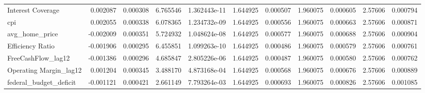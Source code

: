 \documentclass[12pt,a4paper,english]{article}
\begin{document}
{{\begin{tabular}{@{}lrrrrrrrrrr@{}}
			Interest Coverage              & 0.002087                 & 0.000308                    & 6.765546                  & 1.362443e-11                             & 1.644925                      & 0.000507                      & 1.960075                     & 0.000605                     & 2.57606                      & 0.000794                     \\
			cpi                            & 0.002055                 & 0.000338                    & 6.078365                  & 1.234732e-09                             & 1.644925                      & 0.000556                      & 1.960075                     & 0.000663                     & 2.57606                      & 0.000871                     \\
			avg\_home\_price               & -0.002009                & 0.000351                    & 5.724932                  & 1.048624e-08                             & 1.644925                      & 0.000577                      & 1.960075                     & 0.000688                     & 2.57606                      & 0.000904                     \\
			Efficiency Ratio               & -0.001906                & 0.000295                    & 6.455851                  & 1.099263e-10                             & 1.644925                      & 0.000486                      & 1.960075                     & 0.000579                     & 2.57606                      & 0.000761                     \\
			FreeCashFlow\_lag12            & -0.001386                & 0.000296                    & 4.685847                  & 2.805226e-06                             & 1.644925                      & 0.000487                      & 1.960075                     & 0.000580                     & 2.57606                      & 0.000762                     \\
			Operating Margin\_lag12        & 0.001204                 & 0.000345                    & 3.488170                  & 4.873168e-04                             & 1.644925                      & 0.000568                      & 1.960075                     & 0.000676                     & 2.57606                      & 0.000889                     \\
			federal\_budget\_deficit       & -0.001121                & 0.000421                    & 2.661149                  & 7.793264e-03                             & 1.644925                      & 0.000693                      & 1.960075                     & 0.000826                     & 2.57606                      & 0.001085                     \\

\end{tabular}}}
\end{document}
